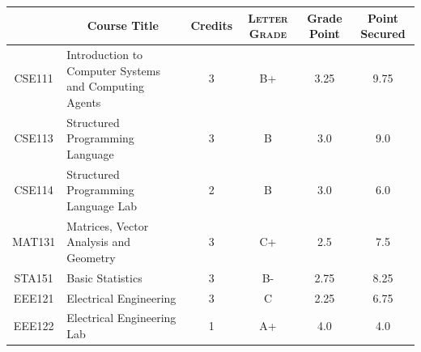 \documentclass[11pt]{article}
\newcommand*{\numtwo}[1]{\pgfmathprintnumber[
                    fixed, precision=2, fixed zerofill=true]{#1}}
\begin{document}
                \begin{center}
                    \renewcommand{\arraystretch}{1.08}
                    
                \begin{tabular}{|c|l|c|>{\scshape}c|c|c|}
                \hline  \rule[-1ex]{0pt}{3.5ex} {\centering{\bf Course Code}} &  \multicolumn{1}{c|}{\textbf{Course Title}}  & {\bf Credits} & {\bf Letter Grade} & {\bf Grade Point} & {\bf Point Secured}  \\ 
                \hline   CSE111 &  Introduction to Computer Systems and Computing Agents		 & 3 & B+ & 3.25 & 9.75 \\ %
                \hline   CSE113 &  Structured Programming Language		 & 3 & B & 3.0 & 9.0 \\ %
                \hline   CSE114 &  Structured Programming Language Lab		 & 2 & B & 3.0 & 6.0 \\ %
                \hline   MAT131 &  Matrices, Vector Analysis and Geometry		 & 3 & C+ & 2.5 & 7.5 \\ %
                \hline   STA151 &  Basic Statistics		 & 3 & B- & 2.75 & 8.25 \\ %
                \hline   EEE121 &  Electrical Engineering		 & 3 & C & 2.25 & 6.75 \\ %
                \hline   EEE122 &  Electrical Engineering Lab		 & 1 & A+ & 4.0 & 4.0 \\ %

\hline                %
                \end{tabular}
                \end{center}
                \renewcommand{\arraystretch}{1.03}
\end{document}
